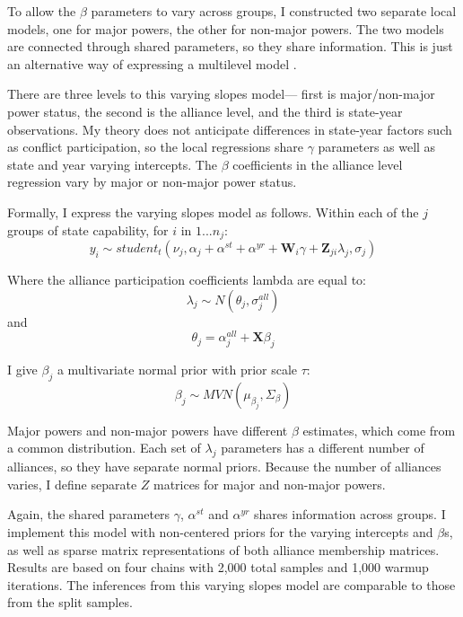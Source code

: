 \documentclass[12pt]{article}
\begin{document}
To allow the $\beta$ parameters to vary across groups, I constructed two separate local models, one for major powers, the other for non-major powers. 
The two models are connected through shared parameters, so they share information.
This is just an alternative way of expressing a multilevel model \citet[pg. 263]{GelmanHill2007}. 


There are three levels to this varying slopes model--- first is major/non-major power status, the second is the alliance level, and the third is state-year observations. 
My theory does not anticipate differences in state-year factors such as conflict participation, so the local regressions share $\gamma$ parameters as well as state and year varying intercepts. 
The $\beta$ coefficients in the alliance level regression vary by major or non-major power status. 


Formally, I express the varying slopes model as follows. 
Within each of the $j$ groups of state capability, for $i$ in $1 ... n_j$: 
\begin{equation}
y_i \sim student_t(\nu_j, \alpha_j + \alpha^{st} + \alpha^{yr} +\textbf{W}_{i} \gamma  + \textbf{Z}_{ji} \lambda_{j}, \sigma_j) 
\end{equation} 

Where the alliance participation coefficients lambda are equal to:
\begin{equation}
\lambda_{j} \sim N(\theta_{j}, \sigma^{all}_{j})
\end{equation} 
and 
\begin{equation}
\theta_{j} = \alpha^{all}_{j} + \textbf{X} \beta_j
\end{equation}


I give $\beta_j$ a multivariate normal prior with prior scale $\tau$:
\begin{equation}
\beta_j \sim MVN(\mu_{\beta_j}, \Sigma_{\beta}) 
\end{equation}

 
Major powers and non-major powers have different $\beta$ estimates, which come from a common distribution. 
Each set of $\lambda_j$ parameters has a different number of alliances, so they have separate normal priors. 
Because the number of alliances varies, I define separate $Z$ matrices for major and non-major powers. 


Again, the shared parameters $\gamma$, $\alpha^{st}$ and $\alpha^{yr}$ shares information across groups. 
I implement this model with non-centered priors for the varying intercepts and $\beta$s, as well as sparse matrix representations of both alliance membership matrices. 
Results are based on four chains with 2,000 total samples and 1,000 warmup iterations. 
The inferences from this varying slopes model are comparable to those from the split samples. 
\end{document}
